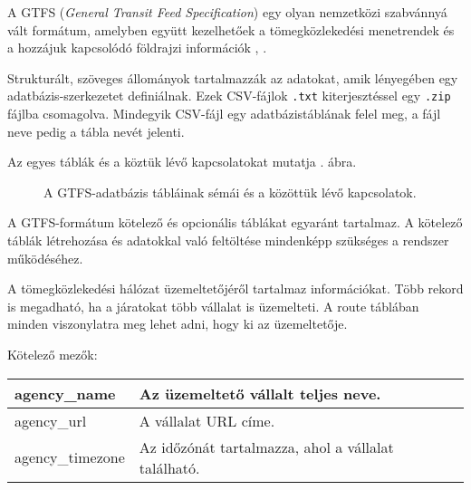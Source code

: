 
A GTFS (\textit{General Transit Feed Specification}) egy olyan nemzetközi szabvánnyá vált formátum, amelyben együtt kezelhetőek a tömegközlekedési menetrendek és a hozzájuk kapcsolódó földrajzi információk \cite{gtfs}, \cite{gtfsspec}.

Strukturált, szöveges állományok tartalmazzák az adatokat, amik lényegében egy adatbázis-szerkezetet definiálnak. Ezek CSV-fájlok \texttt{.txt} kiterjesztéssel egy \texttt{.zip} fájlba csomagolva. Mindegyik CSV-fájl egy adatbázistáblának felel meg, a fájl neve pedig a tábla nevét jelenti.

Az egyes táblák és a köztük lévő kapcsolatokat mutatja . ábra.


\begin{figure}
\centering

\caption{A GTFS-adatbázis tábláinak sémái és a közöttük lévő kapcsolatok.}
\label{fig:gtfs}
\end{figure}

A GTFS-formátum kötelező és opcionális táblákat egyaránt tartalmaz. A kötelező táblák létrehozása és adatokkal való feltöltése mindenképp szükséges a rendszer működéséhez.



A tömegközlekedési hálózat üzemeltetőjéről tartalmaz információkat. Több rekord is megadható, ha a járatokat több vállalat is üzemelteti. A route táblában minden viszonylatra meg lehet adni, hogy ki az üzemeltetője.

\medskip

\noindent Kötelező mezők:

\bigskip

\begin{tabular}{|p{3.5cm}|p{10cm}|}
\hline
agency\_name & Az üzemeltető vállalt teljes neve. \\
\hline
agency\_url & A vállalat URL címe. \\
\hline
agency\_timezone & Az időzónát tartalmazza, ahol a vállalat található. \\
\hline
\end{tabular}

